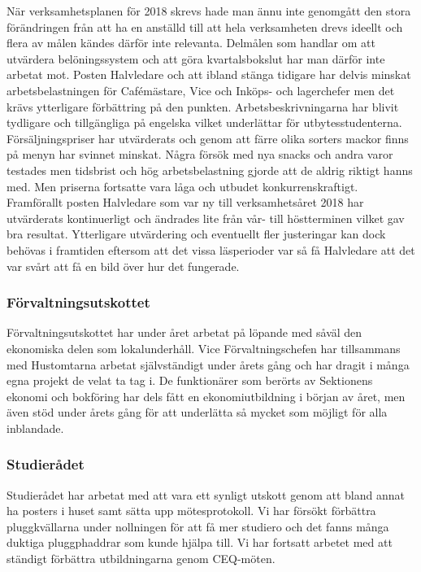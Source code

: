 \documentclass[../_main/handlingar.tex]{subfiles}
\begin{document}
När verksamhetsplanen för 2018 skrevs hade man ännu inte genomgått den stora förändringen från
att ha en anställd till att hela verksamheten drevs ideellt och flera av målen kändes därför inte
relevanta. Delmålen som handlar om att utvärdera belöningssystem och att göra kvartalsbokslut har
man därför inte arbetat mot. Posten Halvledare och att ibland stänga tidigare har delvis minskat
arbetsbelastningen för Cafémästare, Vice och Inköps- och lagerchefer men det krävs ytterligare
förbättring på den punkten. Arbetsbeskrivningarna har blivit tydligare och tillgängliga på engelska
vilket underlättar för utbytesstudenterna.
Försäljningspriser har utvärderats och genom att färre olika sorters mackor finns på menyn har
svinnet minskat. Några försök med nya snacks och andra varor testades men tidsbrist och hög
arbetsbelastning gjorde att de aldrig riktigt hanns med. Men priserna fortsatte vara låga och utbudet
konkurrenskraftigt.
Framförallt posten Halvledare som var ny till verksamhetsåret 2018 har utvärderats kontinuerligt och
ändrades lite från vår- till höstterminen vilket gav bra resultat. Ytterligare utvärdering och eventuellt
fler justeringar kan dock behövas i framtiden eftersom att det vissa läsperioder var så få Halvledare
att det var svårt att få en bild över hur det fungerade.

\subsubsection*{Förvaltningsutskottet}

Förvaltningsutskottet har under året arbetat på löpande med såväl den ekonomiska delen
som lokalunderhåll. Vice Förvaltningschefen har tillsammans med Hustomtarna arbetat
självständigt under årets gång och har dragit i många egna projekt de velat ta tag i. De
funktionärer som berörts av Sektionens ekonomi och bokföring har dels fått en
ekonomiutbildning i början av året, men även stöd under årets gång för att underlätta så
mycket som möjligt för alla inblandade.

\subsubsection*{Studierådet}

Studierådet har arbetat med att vara ett synligt utskott genom att bland annat ha posters i huset samt sätta upp mötesprotokoll. Vi har försökt förbättra pluggkvällarna under nollningen för att få mer studiero och det fanns många duktiga pluggphaddrar som kunde hjälpa till. Vi har fortsatt arbetet med att ständigt förbättra utbildningarna genom CEQ-möten.
\end{document}

